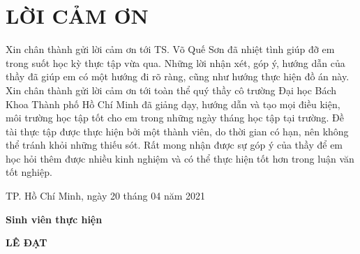 \documentclass[13pt,a4paper]{article}
\begin{document}
\cleardoublepage
{}
\tableofcontents
\thispagestyle{empty}

\cleardoublepage
\section*{LỜI CẢM ƠN}
\thispagestyle{empty}
Xin chân thành gửi lời cảm ơn tới TS. Võ Quế Sơn đã nhiệt tình giúp đỡ em trong suốt học kỳ thực tập vừa qua. Những lời nhận xét, góp ý, hướng dẫn của thầy đã giúp em có một hướng đi rõ ràng, cũng như hướng thực hiện đồ án này. Xin chân thành gửi lời cảm ơn tới toàn thể quý thầy cô trường Đại học Bách Khoa 
Thành phố Hồ Chí Minh đã giảng dạy, hướng dẫn và tạo mọi điều kiện, môi trường học tập tốt cho em trong những ngày tháng học tập tại trường. Đề tài thực tập được thực hiện bởi một thành viên, do thời gian có hạn, nên không thể tránh khỏi những thiếu sót. Rất mong nhận được sự góp ý của thầy để em học  hỏi thêm được nhiều kinh nghiệm và có thể thực hiện tốt hơn trong luận văn tốt nghiệp.

\vspace{6pt}
\hspace{7cm} TP. Hồ Chí Minh, ngày 20 tháng 04 năm 2021

\hspace{9cm}\textbf{Sinh viên thực hiện}

\vspace{2cm}
\hspace{9.85cm}\textbf{LÊ ĐẠT}
\end{document}

